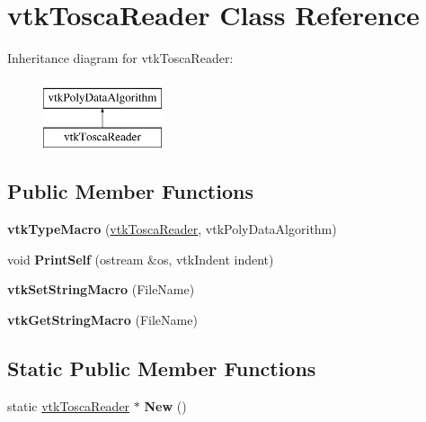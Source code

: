 \hypertarget{classvtk_tosca_reader}{}\section{vtk\+Tosca\+Reader Class Reference}
\label{classvtk_tosca_reader}
Inheritance diagram for vtk\+Tosca\+Reader\+:\begin{figure}[H]
\begin{center}
\leavevmode
\includegraphics[height=2.000000cm]{classvtk_tosca_reader}
\end{center}
\end{figure}
\subsection*{Public Member Functions}
\begin{DoxyCompactItemize}
\item 
\hypertarget{classvtk_tosca_reader_ae44f2a709e33769fffde7e99c64cddfa}{}{\bfseries vtk\+Type\+Macro} (\hyperlink{classvtk_tosca_reader}{vtk\+Tosca\+Reader}, vtk\+Poly\+Data\+Algorithm)\label{classvtk_tosca_reader_ae44f2a709e33769fffde7e99c64cddfa}

\item 
\hypertarget{classvtk_tosca_reader_a77e101f7debdb260b8b3ae545eb16162}{}void {\bfseries Print\+Self} (ostream \&os, vtk\+Indent indent)\label{classvtk_tosca_reader_a77e101f7debdb260b8b3ae545eb16162}

\item 
\hypertarget{classvtk_tosca_reader_a9965eeca0fd055069e92685b1cc8ec30}{}{\bfseries vtk\+Set\+String\+Macro} (File\+Name)\label{classvtk_tosca_reader_a9965eeca0fd055069e92685b1cc8ec30}

\item 
\hypertarget{classvtk_tosca_reader_a8821c707ee26d9ac62dc0b027e05e611}{}{\bfseries vtk\+Get\+String\+Macro} (File\+Name)\label{classvtk_tosca_reader_a8821c707ee26d9ac62dc0b027e05e611}

\end{DoxyCompactItemize}
\subsection*{Static Public Member Functions}
\begin{DoxyCompactItemize}
\item 
\hypertarget{classvtk_tosca_reader_ae8c2673e638b0aaed78394f40e2eb9f5}{}static \hyperlink{classvtk_tosca_reader}{vtk\+Tosca\+Reader} $\ast$ {\bfseries New} ()\label{classvtk_tosca_reader_ae8c2673e638b0aaed78394f40e2eb9f5}

\end{DoxyCompactItemize}
